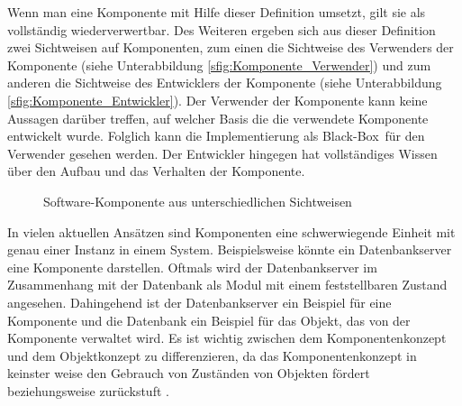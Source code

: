 Wenn man eine Komponente mit Hilfe dieser Definition umsetzt, gilt sie als vollständig wiederverwertbar. Des Weiteren ergeben sich aus dieser Definition zwei Sichtweisen auf Komponenten, zum einen die Sichtweise des Verwenders der Komponente (siehe Unterabbildung \ref{sfig:Komponente_Verwender}) und zum anderen die Sichtweise des Entwicklers der Komponente (siehe Unterabbildung \ref{sfig:Komponente_Entwickler}). Der Verwender der Komponente kann keine Aussagen darüber treffen, auf welcher Basis die die verwendete Komponente entwickelt wurde. Folglich kann die Implementierung als \glqq Black-Box\grqq\ für den Verwender gesehen werden. Der Entwickler hingegen hat vollständiges Wissen über den Aufbau und das Verhalten der Komponente.

\begin{figure}[h]
  \centering
  \qquad
  \caption[
    Software-Komponente aus unterschiedlichen Sichtweisen
  ]{
    Software-Komponente aus unterschiedlichen Sichtweisen
  }
  \label{fig:Komponente_Sichtweise}
\end{figure}

In vielen aktuellen Ansätzen sind Komponenten eine schwerwiegende Einheit mit genau einer Instanz in einem System. Beispielsweise könnte ein Datenbankserver eine Komponente darstellen. Oftmals wird der Datenbankserver im Zusammenhang mit der Datenbank als Modul mit einem feststellbaren Zustand angesehen. Dahingehend ist der Datenbankserver ein Beispiel für eine Komponente und die Datenbank ein Beispiel für das Objekt, das von der Komponente verwaltet wird. Es ist wichtig zwischen dem Komponentenkonzept und dem Objektkonzept zu differenzieren, da das Komponentenkonzept in keinster weise den Gebrauch von Zuständen von Objekten fördert beziehungsweise zurückstuft \citereset \autocite{Szyperski.2002}.

